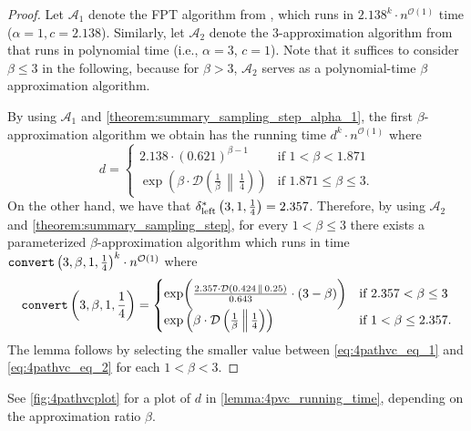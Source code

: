 \documentclass[letterpaper,11pt]{article}
\newcommand{\1}[1]{\mathds{1}\left[#1\right]}
\newcommand{\runtime}[1][\alpha, \beta, c, q]{\textnormal{\texttt{convert}}\left(#1\right)}
\newcommand{\D}[2]{\mathcal{D}\left(#1\, \middle\|\,#2 \right)}
\newcommand{\Oh}{\mathcal{O}}
\newcommand{\sdeltal}{\delta^{*}_{\textnormal{left}}}
\begin{document}
\begin{proof}
	Let $\mathcal{A}_1$ denote the FPT algorithm from \cite{cervenyGeneratingFasterAlgorithms2023}, which runs in $2.138^{k} \cdot n^{\Oh(1)}$ time
	($\alpha = 1, c = 2.138$).
	Similarly, let $\mathcal{A}_2$ denote the 3-approximation algorithm from \cite{Camby2014} that runs in polynomial time
	(i.e., $\alpha = 3$, $c = 1$).
	Note that it suffices to consider $\beta \leq 3$ in the following, because for $\beta > 3$, $\mathcal{A}_2$ serves as a polynomial-time $\beta$ approximation algorithm.

	By using $\mathcal{A}_1$ and \cref{theorem:summary_sampling_step_alpha_1}, the first $\beta$-approximation algorithm we obtain
	has the running time $d^{k} \cdot n^{\Oh(1)}$ where
	\begin{equation}\label{eq:4pathvc_eq_1}
		d = \begin{cases}
			2.138 \cdot \left(0.621\right) ^{\beta - 1} &\text{if } 1 < \beta < 1.871\\
			\exp\left( \beta \cdot \D{\frac{1}{\beta}}{\frac{1}{4}} \right) &\text{if } 1.871 \leq \beta \leq 3.
		\end{cases}
	\end{equation}
	On the other hand, we have that $\sdeltal\left( 3,1,\frac{1}{4}
	\right) = 2.357$. Therefore, by using $\mathcal{A}_2$ and
	\cref{theorem:summary_sampling_step}, for every $1 < \beta \leq
	3$ there exists a parameterized $\beta$-approximation algorithm
	which runs in time $\runtime[3, \beta, 1, \frac{1}{4}]^{k}
	\cdot n^{\Oh(1)}$ where
	\begin{equation}\label{eq:4pathvc_eq_2}
		\runtime[3, \beta, 1, \frac{1}{4}] = \begin{cases}
			\exp\biggl( \frac{ 2.357 \cdot \D{ 0.424 }{ 0.25 }  }{ 0.643 } \cdot (3 - \beta)  \biggr) &\text{if } 2.357 < \beta \leq 3 \\
			\exp\left( \beta \cdot \D{\frac{1}{\beta}}{\frac{1}{4}} \right) &\text{if } 1 < \beta \leq 2.357 .
		\end{cases}
	\end{equation}
	The lemma follows by selecting the smaller value between
	\eqref{eq:4pathvc_eq_1} and \eqref{eq:4pathvc_eq_2} for each $1 < \beta
	< 3$.
\end{proof}

See \cref{fig:4pathvcplot} for a plot of $d$ in \cref{lemma:4pvc_running_time}, depending on
the approximation ratio $\beta$.
\end{document}
